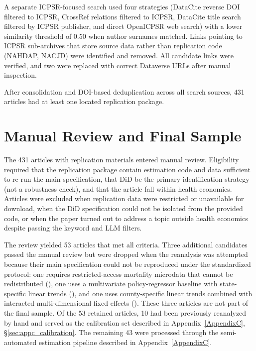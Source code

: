 A separate ICPSR-focused search used four strategies (DataCite reverse DOI filtered to ICPSR, CrossRef relations filtered to ICPSR, DataCite title search filtered by ICPSR publisher, and direct OpenICPSR web search) with a lower similarity threshold of 0.50 when author surnames matched. Links pointing to ICPSR sub-archives that store source data rather than replication code (NAHDAP, NACJD) were identified and removed. All candidate links were verified, and two were replaced with correct Dataverse URLs after manual inspection.

After consolidation and DOI-based deduplication across all search sources, 431 articles had at least one located replication package.

\section{Manual Review and Final Sample}

The 431 articles with replication materials entered manual review. Eligibility required that the replication package contain estimation code and data sufficient to re-run the main specification, that DiD be the primary identification strategy (not a robustness check), and that the article fall within health economics. Articles were excluded when replication data were restricted or unavailable for download, when the DiD specification could not be isolated from the provided code, or when the paper turned out to address a topic outside health economics despite passing the keyword and LLM filters.

The review yielded 53 articles that met all criteria. Three additional candidates passed the manual review but were dropped when the reanalysis was attempted because their main specification could not be reproduced under the standardized protocol: one requires restricted-access mortality microdata that cannot be redistributed (\textcite{moorthy2025bluecollar}), one uses a multivariate policy-regressor baseline with state-specific linear trends (\textcite{myers2017power}), and one uses county-specific linear trends combined with interacted multi-dimensional fixed effects (\textcite{kuziemko2018managed}). These three articles are not part of the final sample. Of the 53 retained articles, 10 had been previously reanalyzed by hand and served as the calibration set described in Appendix~\ref{AppendixC}, §\ref{sec:appc_calibration}. The remaining 43 were processed through the semi-automated estimation pipeline described in Appendix~\ref{AppendixC}.

